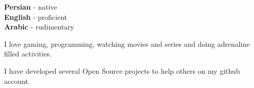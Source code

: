 \documentclass[9pt]{developercv} %
\begin{document}
\begin{minipage}[t]{0.3\textwidth}
	\vspace{-\baselineskip} %

	
	\textbf{Persian} - native\\
	\textbf{English} - proficient\\
	\textbf{Arabic}  - rudimentary
\end{minipage}
\hfill
\begin{minipage}[t]{0.3\textwidth}
	\vspace{-\baselineskip} %
	
	
	I love gaming, programming, watching movies and series and doing adrenaline filled activities.
\end{minipage}
\hfill
\begin{minipage}[t]{0.3\textwidth}
	\vspace{-\baselineskip} %
	
	
	I have developed several Open Source projects to help others on my github account.
\end{minipage}

\end{document}

